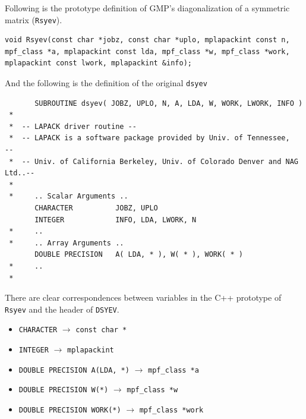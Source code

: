 \documentclass[12pt]{article}
\begin{document}
Following is the prototype definition of GMP's diagonalization of a symmetric matrix ({\tt Rsyev}).
\begin{verbatim}
void Rsyev(const char *jobz, const char *uplo, mplapackint const n,
mpf_class *a, mplapackint const lda, mpf_class *w, mpf_class *work,
mplapackint const lwork, mplapackint &info);
\end{verbatim}
And the following is the definition of the original {\tt dsyev}
\begin{verbatim}
       SUBROUTINE dsyev( JOBZ, UPLO, N, A, LDA, W, WORK, LWORK, INFO )
 *
 *  -- LAPACK driver routine --
 *  -- LAPACK is a software package provided by Univ. of Tennessee,    --
 *  -- Univ. of California Berkeley, Univ. of Colorado Denver and NAG Ltd..--
 *
 *     .. Scalar Arguments ..
       CHARACTER          JOBZ, UPLO
       INTEGER            INFO, LDA, LWORK, N
 *     ..
 *     .. Array Arguments ..
       DOUBLE PRECISION   A( LDA, * ), W( * ), WORK( * )
 *     ..
 *
\end{verbatim}
There are clear correspondences between variables in the C++ prototype of {\tt Rsyev} and the header of {\tt DSYEV}.
\begin{itemize}
    \item {\tt CHARACTER} $\rightarrow$ {\tt const char *}
    \item {\tt INTEGER} $\rightarrow$ {\tt mplapackint}
    \item {\tt DOUBLE PRECISION A(LDA, *)} $\rightarrow$ {\tt mpf\_class *a}
    \item {\tt DOUBLE PRECISION W(*)} $\rightarrow$ {\tt mpf\_class *w}
    \item {\tt DOUBLE PRECISION WORK(*)} $\rightarrow$ {\tt mpf\_class *work}
\end{itemize}
\end{document}
